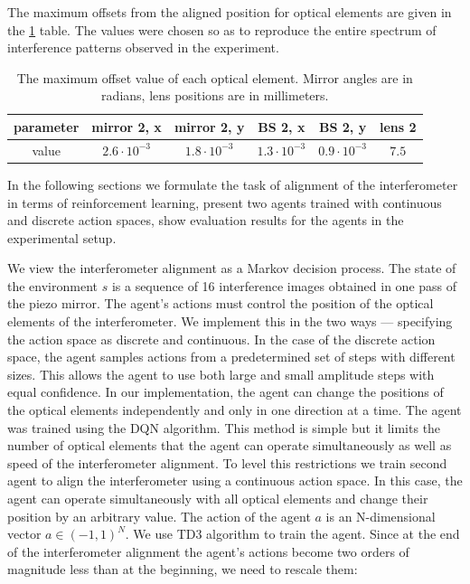 The maximum offsets from the aligned position for optical elements are given in the \ref{tab:interf_dyn_params} table. The values were chosen so as to reproduce the entire spectrum of interference patterns observed in the experiment.

\begin{table} [htbp]
    \centering
    \begin{threeparttable}%
        \caption{The maximum offset value of each optical element. Mirror angles are in radians, lens positions are in millimeters.}
        \begin{tabular}{|c|c|c|c|c|c|}
            \hline
            \hline
            parameter & mirror 2, x & mirror 2, y & BS 2, x & BS 2, y & lens 2 \\
            \hline
            value & $2.6 \cdot 10^{-3}$ & $1.8 \cdot 10^{-3}$ & $1.3 \cdot 10^{-3}$ & $0.9 \cdot 10^{-3}$ & $7.5$ \\
            \hline
            \hline
        \end{tabular}
        \label{tab:interf_dyn_params}
    \end{threeparttable}
\end{table}


In the following sections we formulate the task of alignment of the interferometer in terms of reinforcement learning, present two agents trained with continuous and discrete action spaces, show evaluation results for the agents in the experimental setup. 

We view the interferometer alignment as a Markov decision process. The state of the environment $s$ is a sequence of 16 interference images obtained in one pass of the piezo mirror. The agent's actions must control the position of the optical elements of the interferometer. We implement this in the two ways --- specifying the action space as discrete and continuous. In the case of the discrete action space, the agent samples actions from a predetermined set of steps with different sizes. This allows the agent to use both large and small amplitude steps with equal confidence. In our implementation, the agent can change the positions of the optical elements independently and only in one direction at a time.  The agent was trained using the DQN \cite{dqn} algorithm. 
This method is simple but it limits the number of optical elements that the agent can operate simultaneously as well as speed of the interferometer alignment. To level this restrictions we  train second agent to align the interferometer using a continuous action space. In this case, the agent can operate simultaneously with all optical elements and change their position by an arbitrary value. The action of the agent $a$ is an N-dimensional vector $a \in (-1, 1)^{N}$. We use TD3 \cite{ddpg} algorithm to train the agent. Since at the end of the interferometer alignment the agent's actions become two orders of magnitude less than at the beginning, we need to rescale them:

